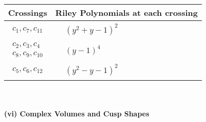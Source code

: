\documentclass[1p]{elsarticle_modified}
\theoremstyle{definition}
\begin{document}
\begin{tabular}{m{50pt}|m{274pt}}
Crossings & \hspace{64pt}Riley Polynomials at each crossing \\
\hline $$\begin{aligned}c_{1},c_{7},c_{11}\end{aligned}$$&$\begin{aligned}
&(y^2+y-1)^2
\end{aligned}$\\
\hline $$\begin{aligned}c_{2},c_{3},c_{4}\\c_{8},c_{9},c_{10}\end{aligned}$$&$\begin{aligned}
&(y-1)^4
\end{aligned}$\\
\hline $$\begin{aligned}c_{5},c_{6},c_{12}\end{aligned}$$&$\begin{aligned}
&(y^2- y-1)^2
\end{aligned}$\\
\hline
\end{tabular}\\~\\
\newpage\flushleft \textbf{(vi) Complex Volumes and Cusp Shapes}
\end{document}
